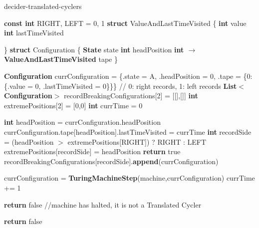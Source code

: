 \begin{algorithm}
  \caption{{\sc decider-translated-cyclers}}\label{alg:translated-cyclers}

  \begin{algorithmic}[1]
    \State \textbf{const int} RIGHT, LEFT = 0, 1
    \State \textbf{struct} ValueAndLastTimeVisited \{
    \State \tabi\textbf{int} value
    \State \tabi\textbf{int} lastTimeVisited


    \State \}
    \State \textbf{struct} Configuration \{
    \State \tabi\textbf{State} state
    \State \tabi\textbf{int} headPosition
    \State \tabi\textbf{int $\boldsymbol{\to}$ ValueAndLastTimeVisited} tape
    \State \}
    \State


    \State \textbf{Configuration} currConfiguration = \{.state = \textcolor{colorA}{A}, .headPosition = 0, .tape = \{0:\{.value = 0, .lastTimeVisited = 0\}\}\}
    \State // 0: right records, 1: left records
    \State \textbf{List$\boldsymbol{<}$Configuration$\boldsymbol{>}$}
    recordBreakingConfigurations[2] = [[],[]]
    \State \textbf{int} extremePositions[2] = [0,0]
    \State \textbf{int} currTime = 0

    \State \textbf{int} headPosition = currConfiguration.headPosition
    \State currConfiguration.tape[headPosition].lastTimeVisited = currTime
    \State \textbf{int} recordSide = (headPosition $>$ extremePositions[RIGHT]) ? RIGHT : LEFT
    \State extremePositions[recordSide] = headPosition
    \State \textbf{return} true
    \EndIf
    \State recordBreakingConfigurations[recordSide].\textbf{append}(currConfiguration)
    \EndIf

    \State currConfiguration = \textbf{TuringMachineStep}(machine,currConfiguration)
    \State currTime += 1


    \State \textbf{return} false //machine has halted, it is not a Translated Cycler
    \EndIf
    \EndWhile

    \State \textbf{return} false
    \EndProcedure

  \end{algorithmic}
\end{algorithm}
